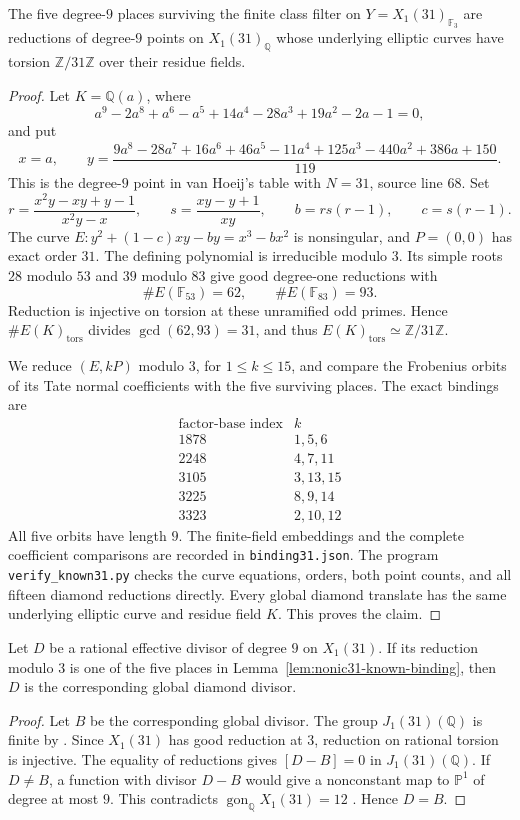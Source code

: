 \begin{lemma}\label{lem:nonic31-known-binding}
The five degree-$9$ places surviving the finite class filter on
$Y=X_1(31)_{\mathbb F_3}$ are reductions of degree-$9$ points on
$X_1(31)_{\mathbb Q}$ whose underlying elliptic curves have torsion
$\mathbb Z/31\mathbb Z$ over their residue fields.
\end{lemma}
\begin{proof}
Let $K=\mathbb Q(a)$, where
\[
 a^9-2a^8+a^6-a^5+14a^4-28a^3+19a^2-2a-1=0,
\]
and put
\[
 x=a,\qquad
 y=\frac{9a^8-28a^7+16a^6+46a^5-11a^4+125a^3-440a^2+386a+150}{119}.
\]
This is the degree-$9$ point in van Hoeij's table with $N=31$,
source line $68$. Set
\[
 r=\frac{x^2y-xy+y-1}{x^2y-x},\qquad
 s=\frac{xy-y+1}{xy},\qquad b=rs(r-1),\qquad c=s(r-1).
\]
The curve $E:y^2+(1-c)xy-by=x^3-bx^2$ is nonsingular, and
$P=(0,0)$ has exact order $31$. The defining polynomial is irreducible
modulo $3$. Its simple roots $28$ modulo $53$ and $39$ modulo $83$
give good degree-one reductions with
\[
 \#E(\mathbb F_{53})=62,\qquad \#E(\mathbb F_{83})=93.
\]
Reduction is injective on torsion at these unramified odd primes.
Hence $\#E(K)_{\mathrm{tors}}$ divides $\gcd(62,93)=31$, and thus
$E(K)_{\mathrm{tors}}\simeq\mathbb Z/31\mathbb Z$.

We reduce $(E,kP)$ modulo $3$, for $1\leq k\leq15$, and compare the
Frobenius orbits of its Tate normal coefficients with the five surviving
places. The exact bindings are
\[
\begin{array}{c|c}
\text{factor-base index}&k\\ \hline
1878&1,5,6\\
2248&4,7,11\\
3105&3,13,15\\
3225&8,9,14\\
3323&2,10,12
\end{array}
\]
All five orbits have length $9$. The finite-field embeddings and the
complete coefficient comparisons are recorded in \texttt{binding31.json}.
The program \texttt{verify\_known31.py} checks the curve equations,
orders, both point counts, and all fifteen diamond reductions directly.
Every global diamond translate has the same underlying elliptic curve
and residue field $K$. This proves the claim.
\end{proof}

\begin{lemma}\label{lem:nonic31-rigidity}
Let $D$ be a rational effective divisor of degree $9$ on $X_1(31)$.
If its reduction modulo $3$ is one of the five places in
Lemma~\ref{lem:nonic31-known-binding}, then $D$ is the corresponding
global diamond divisor.
\end{lemma}
\begin{proof}
Let $B$ be the corresponding global divisor. The group
$J_1(31)(\mathbb Q)$ is finite by \cite[Theorem~3.1(2)]{DEHMZ}.
Since $X_1(31)$ has good reduction at $3$, reduction on rational torsion
is injective. The equality of reductions gives $[D-B]=0$ in
$J_1(31)(\mathbb Q)$. If $D\ne B$, a function with divisor $D-B$
would give a nonconstant map to $\mathbb P^1$ of degree at most $9$.
This contradicts $\operatorname{gon}_{\mathbb Q}X_1(31)=12$
\cite{DvH}. Hence $D=B$.
\end{proof}

